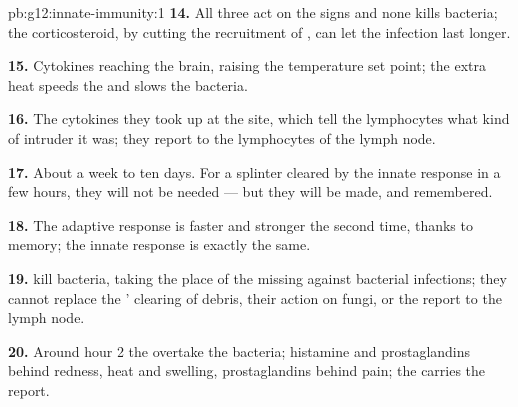 \begin{solution}{pb:g12:innate-immunity:1}
\textbf{14.} All three act on the signs and none kills bacteria; the
corticosteroid, by cutting the recruitment of , can let the
infection last longer.

\textbf{15.} Cytokines reaching the brain, raising the temperature set
point; the extra heat speeds the  and slows the bacteria.

\textbf{16.} The cytokines they took up at the site, which tell the
lymphocytes what kind of intruder it was; they report to the
lymphocytes of the lymph node.

\textbf{17.} About a week to ten days. For a splinter cleared by the
innate response in a few hours, they will not be needed --- but they
will be made, and remembered.

\textbf{18.} The adaptive response is faster and stronger the second
time, thanks to memory; the innate response is exactly the same.

\textbf{19.}  kill bacteria, taking the place of the
missing  against bacterial infections; they cannot replace
the ' clearing of debris, their action on fungi, or the
report to the lymph node.

\textbf{20.} Around hour 2 the  overtake the bacteria;
histamine and prostaglandins behind redness, heat and swelling,
prostaglandins behind pain; the  carries the report.
\end{solution}

